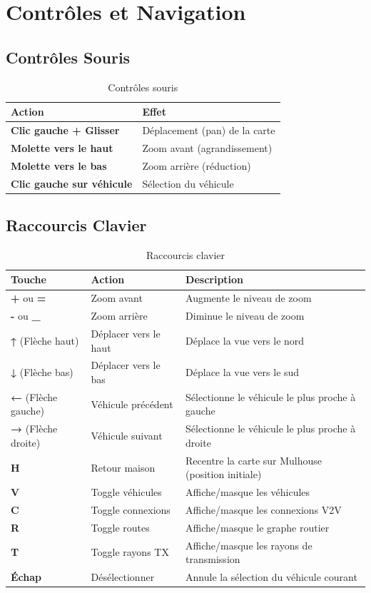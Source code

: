 \documentclass[12pt,a4paper]{article}
\begin{document}
\section{Contrôles et Navigation}

\subsection{Contrôles Souris}

\begin{table}[H]
\centering
\begin{tabular}{lp{10cm}}
\toprule
\textbf{Action} & \textbf{Effet} \\
\midrule
\textbf{Clic gauche + Glisser} & Déplacement (pan) de la carte \\
\textbf{Molette vers le haut} & Zoom avant (agrandissement) \\
\textbf{Molette vers le bas} & Zoom arrière (réduction) \\
\textbf{Clic gauche sur véhicule} & Sélection du véhicule \\
\bottomrule
\end{tabular}
\caption{Contrôles souris}
\end{table}

\subsection{Raccourcis Clavier}

\begin{table}[H]
\centering
\begin{tabular}{llp{8cm}}
\toprule
\textbf{Touche} & \textbf{Action} & \textbf{Description} \\
\midrule
\textbf{+} ou \textbf{=} & Zoom avant & Augmente le niveau de zoom \\
\textbf{-} ou \textbf{\_} & Zoom arrière & Diminue le niveau de zoom \\
\textbf{↑} (Flèche haut) & Déplacer vers le haut & Déplace la vue vers le nord \\
\textbf{↓} (Flèche bas) & Déplacer vers le bas & Déplace la vue vers le sud \\
\textbf{←} (Flèche gauche) & Véhicule précédent & Sélectionne le véhicule le plus proche à gauche \\
\textbf{→} (Flèche droite) & Véhicule suivant & Sélectionne le véhicule le plus proche à droite \\
\textbf{H} & Retour maison & Recentre la carte sur Mulhouse (position initiale) \\
\textbf{V} & Toggle véhicules & Affiche/masque les véhicules \\
\textbf{C} & Toggle connexions & Affiche/masque les connexions V2V \\
\textbf{R} & Toggle routes & Affiche/masque le graphe routier \\
\textbf{T} & Toggle rayons TX & Affiche/masque les rayons de transmission \\
\textbf{Échap} & Désélectionner & Annule la sélection du véhicule courant \\
\bottomrule
\end{tabular}
\caption{Raccourcis clavier}
\end{table}
\end{document}
